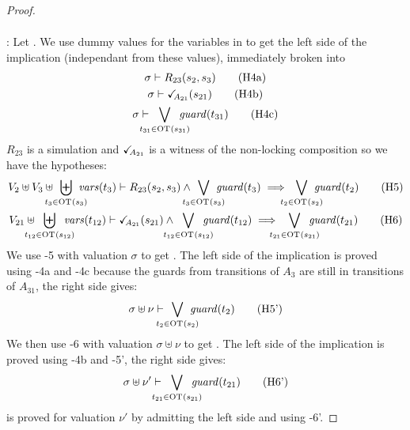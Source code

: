 \documentclass{article}
\begin{document}
\begin{proof}
\begin{align*}
	\end{align*}
\item[\goal{1}:] Let .
	We use dummy values for the variables in  to get the left side of the implication (independant from these values), immediately broken into
	\begin{gather}
		\sigma \vdash R_{23}\mpar{s_2, s_3} \hyp{4a} \\
		\sigma \vdash \reach{A_{21}}\mpar{s_{21}} \hyp{4b} \\
		\sigma \vdash \bigvee_\subbox{t_{31} \in \fOT{s_{31}}} \fguard{t_{31}} \hyp{4c}
	\end{gather}
	\(R_{23}\) is a simulation and \(\checkmark_{\!\! A_{21}}\) is a witness of the non-locking composition so we have the hypotheses:
	\begin{gather}
		V_2 \uplus V_3 \uplus \biguplus_\subbox{t_3 \in \fOT{s_3}} \fvars{t_3} \vdash R_{23}\mpar{s_2, s_3} \wedge \bigvee_\subbox{t_3 \in \fOT{s_3}} \fguard{t_3} \implies \bigvee_\subbox{t_2 \in \fOT{s_2}} \fguard{t_2} \hyp{5} \\
		V_{21} \uplus \biguplus_\subbox{t_{12} \in \fOT{s_{12}}} \fvars{t_{12}} \vdash \reach{A_{21}}\mpar{s_{21}} \wedge \bigvee_\subbox{t_{12} \in \fOT{s_{12}}} \fguard{t_{12}} \implies \bigvee_\subbox{t_{21} \in \fOT{s_{21}}} \fguard{t_{21}} \hyp{6}
	\end{gather}
	We use \hyp{5} with valuation \(\sigma\) to get .
	The left side of the implication is proved using \hyp{4a} and \hyp{4c} because the guards from transitions of \(A_3\) are still in transitions of \(A_{31}\), the right side gives:
	\[ \sigma \uplus \nu \vdash \bigvee_\subbox{t_2 \in \fOT{s_2}} \fguard{t_2} \hyp{5'} \]
	We then use \hyp{6} with valuation \(\sigma \uplus \nu\) to get .
	The left side of the implication is proved using \hyp{4b} and \hyp{5'}, the right side gives:
	\[ \sigma \uplus \nu' \vdash \bigvee_\subbox{t_{21} \in \fOT{s_{21}}} \fguard{t_{21}} \hyp{6'} \]
	 is proved for valuation \(\nu'\) by admitting the left side and using \hyp{6'}.
\end{proof}
\end{document}
